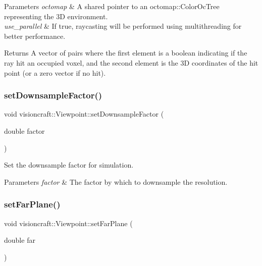 \begin{DoxyParams}{Parameters}
{\em octomap} & A shared pointer to an octomap\+::\+Color\+Oc\+Tree representing the 3D environment. \\
\hline
{\em use\+\_\+parallel} & If true, raycasting will be performed using multithreading for better performance. \\
\hline
\end{DoxyParams}
\begin{DoxyReturn}{Returns}
A vector of pairs where the first element is a boolean indicating if the ray hit an occupied voxel, and the second element is the 3D coordinates of the hit point (or a zero vector if no hit). 
\end{DoxyReturn}
\mbox{\label{classvisioncraft_1_1Viewpoint_a07ef9c64ea32130312d1cb187320abaf}} 
\subsubsection{\texorpdfstring{set\+Downsample\+Factor()}{setDownsampleFactor()}}
{\footnotesize\ttfamily void visioncraft\+::\+Viewpoint\+::set\+Downsample\+Factor (\begin{DoxyParamCaption}\item[{double}]{factor }\end{DoxyParamCaption})}



Set the downsample factor for simulation. 


\begin{DoxyParams}{Parameters}
{\em factor} & The factor by which to downsample the resolution. \\
\hline
\end{DoxyParams}
\mbox{\label{classvisioncraft_1_1Viewpoint_a252c7746319b10a6f41bdb11c01a8487}} 
\subsubsection{\texorpdfstring{set\+Far\+Plane()}{setFarPlane()}}
{\footnotesize\ttfamily void visioncraft\+::\+Viewpoint\+::set\+Far\+Plane (\begin{DoxyParamCaption}\item[{double}]{far }\end{DoxyParamCaption})}



